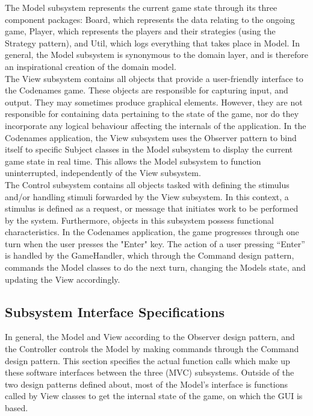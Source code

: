 The Model subsystem represents the current game state through its three component packages: Board, which represents the data relating to the ongoing game, Player, which represents the players and their strategies (using the Strategy pattern), and Util, which logs everything that takes place in Model. In general, the Model subsystem is synonymous to the domain layer, and is therefore an inspirational creation of the domain model. \\

The View subsystem contains all objects that provide a user-friendly interface to the Codenames game. These objects are responsible for capturing input, and output. They may sometimes produce graphical elements. However, they are not responsible for containing data pertaining to the state of the game, nor do they incorporate any logical behaviour affecting the internals of the application. In the Codenames application, the View subsystem uses the Observer pattern to bind itself to specific Subject classes in the Model subsystem to display the current game state in real time. This allows the Model subsystem to function uninterrupted, independently of the View subsystem. \\

The Control subsystem contains all objects tasked with defining the stimulus and/or handling stimuli forwarded by the View subsystem. In this context, a stimulus is defined as a request, or message that initiates work to be performed by the system. Furthermore, objects in this subsystem possess functional characteristics. In the Codenames application, the game progresses through one turn when the user presses the "Enter" key. The action of a user pressing “Enter” is handled by the GameHandler, which through the Command design pattern, commands the Model classes to do the next turn, changing the Models state, and updating the View accordingly. \\

\subsection{Subsystem Interface Specifications}
In general, the Model and View  according to the Observer design pattern, and the Controller controls the Model by making commands through the Command design pattern. This section specifies the actual function calls which make up these software interfaces between the three (MVC) subsystems. Outside of the two design patterns defined about, most of the Model's interface is functions called by View classes to get the internal state of the game, on which the GUI is based.

